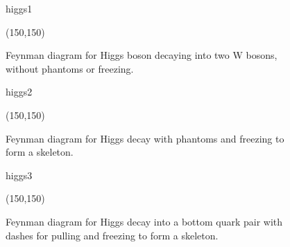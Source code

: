\documentclass[10pt,a4paper]{article}
\begin{document}

\begin{figure}[t!]
	\centering
	\begin{fmffile}{higgs1}
	\begin{fmfgraph}(150,150)
		\fmfstraight
	\end{fmfgraph}
	\end{fmffile}
	\vspace{5mm}
	\caption{Feynman diagram for Higgs boson decaying into two W bosons, without phantoms or freezing.}
	\vspace{5mm}
\end{figure}




\begin{figure}[t!]
	\centering
	\begin{fmffile}{higgs2}
	\begin{fmfgraph}(150,150)
		\fmfstraight
		\fmffreeze
	\end{fmfgraph}
	\end{fmffile}
	\vspace{5mm}
	\caption{Feynman diagram for Higgs decay with phantoms and freezing to form a skeleton.}
	\vspace{5mm}
\end{figure}




\begin{figure}[t!]
	\centering
	\begin{fmffile}{higgs3}
	\begin{fmfgraph}(150,150)
		\fmfstraight
		\fmffreeze
	\end{fmfgraph}
	\end{fmffile}
	\vspace{5mm}
	\caption{Feynman diagram for Higgs decay into a bottom quark pair with dashes for pulling and freezing to form a skeleton.}
	\vspace{5mm}
\end{figure}
\end{document}

